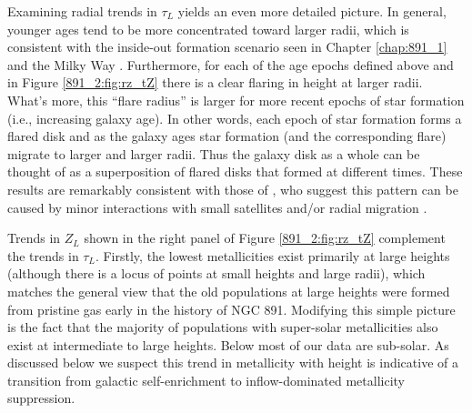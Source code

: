 Examining radial trends in $\tau_L$ yields an even more detailed
picture. In general, younger ages tend to be more concentrated toward
larger radii, which is consistent with the inside-out formation
scenario seen in Chapter \ref{chap:891_1} and the Milky Way
\citep{Bovy12,Hayden15}. Furthermore, for each of the age epochs
defined above and in Figure \ref{891_2:fig:rz_tZ} there is a clear
flaring in height at larger radii. What's more, this ``flare radius''
is larger for more recent epochs of star formation (i.e., increasing
galaxy age). In other words, each epoch of star formation forms a
flared disk and as the galaxy ages star formation (and the
corresponding flare) migrate to larger and larger radii. Thus the
galaxy disk as a whole can be thought of as a superposition of flared
disks that formed at different times. These results are remarkably
consistent with those of \citet{Martig14a}, who suggest this pattern can
be caused by minor interactions with small satellites and/or radial
migration \citep{Minchev12}.

Trends in $Z_L$ shown in the right panel of Figure
\ref{891_2:fig:rz_tZ} complement the trends in $\tau_L$. Firstly, the
lowest metallicities exist primarily at large heights (although there
is a locus of points at small heights and large radii), which matches
the general view that the old populations at large heights were formed
from pristine gas early in the history of NGC 891. Modifying this
simple picture is the fact that the majority of populations with
super-solar metallicities also exist at intermediate to large
heights. Below  most of our data are sub-solar. As
discussed below we suspect this trend in metallicity with height is
indicative of a transition from galactic self-enrichment to
inflow-dominated metallicity suppression.


